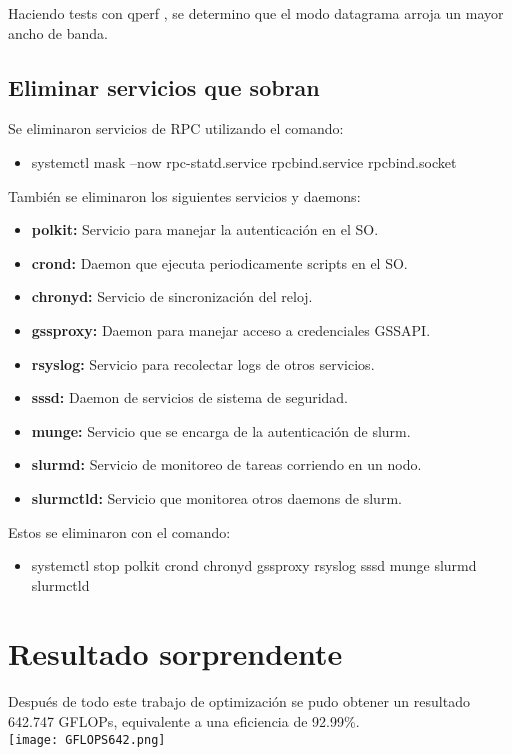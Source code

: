 Haciendo tests con qperf \cite{tutorial-qperf}, se determino que el modo datagrama arroja un mayor ancho de banda.

\subsection{Eliminar servicios que sobran}

Se eliminaron servicios de RPC utilizando el comando:
\begin{itemize}
    \item systemctl mask --now rpc-statd.service rpcbind.service rpcbind.socket
\end{itemize}
También se eliminaron los siguientes servicios y daemons:
\begin{itemize}
    \item \textbf{polkit:} Servicio para manejar la autenticación en el SO.
    \item \textbf{crond:} Daemon que ejecuta periodicamente scripts en el SO.
    \item \textbf{chronyd:} Servicio de sincronización del reloj.
    \item \textbf{gssproxy:} Daemon para manejar acceso a credenciales GSSAPI.
    \item \textbf{rsyslog:} Servicio para recolectar logs de otros servicios.
    \item \textbf{sssd:} Daemon de servicios de sistema de seguridad.
    \item \textbf{munge:} Servicio que se encarga de la autenticación de slurm.
    \item \textbf{slurmd:} Servicio de monitoreo de tareas corriendo en un nodo.
    \item \textbf{slurmctld:} Servicio que monitorea otros daemons de slurm.
\end{itemize}
Estos se eliminaron con el comando:
\begin{itemize}
    \item systemctl stop polkit crond chronyd gssproxy rsyslog sssd munge slurmd slurmctld
\end{itemize}

\section{Resultado sorprendente}

Después de todo este trabajo de optimización se pudo obtener un resultado 642.747 GFLOPs, equivalente a una eficiencia de 92.99\%.\\

\texttt{[image: GFLOPS642.png]}
